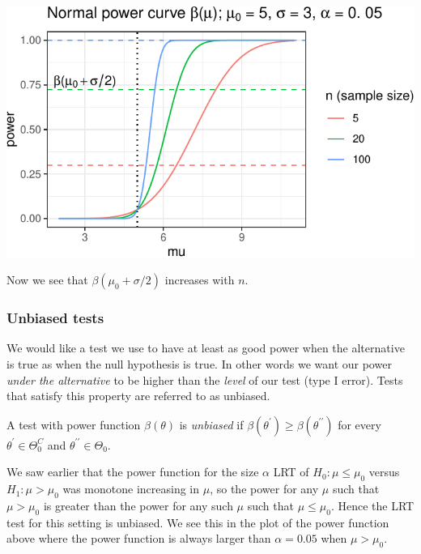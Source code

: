 \documentclass[11pt,]{article}
\begin{document}
\begin{center}\includegraphics[width=1\linewidth]{class_notes_files/figure-latex/plot_normal_power_curve_n-1} \end{center}

Now we see that \(\beta(\mu_0 + \sigma/2)\) increases with \(n\).

\hypertarget{unbiased-tests}{%
\subsubsection{Unbiased tests}\label{unbiased-tests}}

We would like a test we use to have at least as good power when the
alternative is true as when the null hypothesis is true. In other words
we want our power \emph{under the alternative} to be higher than the
\emph{level} of our test (type I error). Tests that satisfy this
property are referred to as unbiased.

 A test with power function
\(\beta(\theta)\) is \emph{unbiased} if
\(\beta(\theta^\prime) \geq \beta(\theta^{\prime\prime})\) for every
\(\theta^\prime \in \Theta_0^C\) and
\(\theta^{\prime\prime} \in \Theta_0\).

We saw earlier that the power function for the size \(\alpha\) LRT of
\(H_0: \mu \leq \mu_0\) versus \(H_1: \mu > \mu_0\) was monotone
increasing in \(\mu\), so the power for any \(\mu\) such that
\(\mu > \mu_0\) is greater than the power for any such \(\mu\) such that
\(\mu \leq \mu_0\). Hence the LRT test for this setting is unbiased. We
see this in the plot of the power function above where the power
function is always larger than \(\alpha = 0.05\) when \(\mu > \mu_0\).
\end{document}
